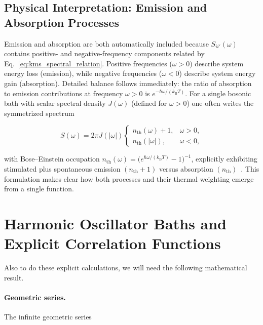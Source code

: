 \subsection{Physical Interpretation: Emission and Absorption Processes}
\label{subsec:physical_emission_absorption}

\noindent
Emission and absorption are both automatically included because $S_{ii'}(\omega)$ contains positive- and negative-frequency components related by Eq.~\eqref{eq:kms_spectral_relation}. Positive frequencies ($\omega>0$) describe system energy loss (emission), while negative frequencies ($\omega<0$) describe system energy gain (absorption). Detailed balance follows immediately: the ratio of absorption to emission contributions at frequency $\omega>0$ is $e^{-\hbar \omega/(k_{\mathrm{B}}T)}$. For a single bosonic bath with scalar spectral density $J(\omega)$ (defined for $\omega>0$) one often writes the symmetrized spectrum

\begin{equation}
	S(\omega) = 2\pi J(|\omega|) \begin{cases} n_{\text{th}}(\omega)+1, & \omega>0, \\ n_{\text{th}}(|\omega|), & \omega<0, \end{cases}
	\label{eq:bose_symmetric_spectrum}
\end{equation}

\noindent
with Bose--Einstein occupation $n_{\text{th}}(\omega) = \big(e^{\hbar\omega/(k_{\mathrm{B}}T)}-1\big)^{-1}$, explicitly exhibiting stimulated plus spontaneous emission $(n_{\text{th}}+1)$ versus absorption $(n_{\text{th}})$~\cite{weiss2012quantumdissipativesystems}. This formulation makes clear how both processes and their thermal weighting emerge from a single function.


\section{Harmonic Oscillator Baths and Explicit Correlation Functions}
\label{sec:harmonic_oscillator_baths}

\noindent
Also to do these explicit calculations, we will need the following mathematical result.


\paragraph{Geometric series.}
The infinite geometric series

